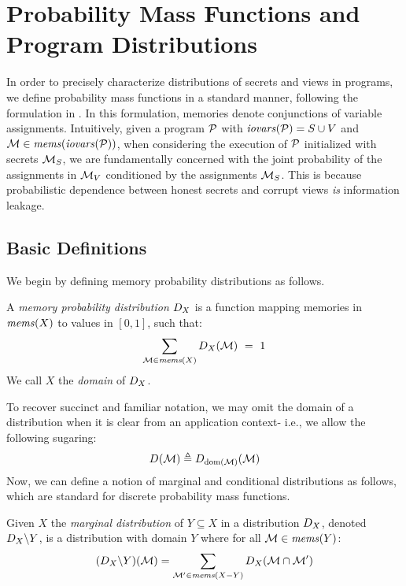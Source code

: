 \section{Probability Mass Functions and Program Distributions}
\label{section-pmf}

In order to precisely characterize distributions of secrets and views
in programs, we define probability mass functions in a standard manner,
following the formulation in \cite{barthe2019probabilistic}. In this formulation, memories
denote conjunctions of variable assignments. Intuitively, given a
program $\mathcal{P}$ with $\mathit{iovars}(\mathcal{P}) = S \cup V$ and $\mathcal{M} \in
\mathit{mems}(\mathit{iovars}(\mathcal{P}))$, when considering the execution of $\mathcal{P}$
initialized with secrets $\mathcal{M}_S$, we are fundamentally concerned
with the joint probability of the assignments in $\mathcal{M}_V$
conditioned by the assignments $\mathcal{M}_S$. This is because
probabilistic dependence between honest secrets and corrupt views
\emph{is} information leakage. 

\subsection{Basic Definitions} We begin by defining memory probability distributions as follows.
\begin{definition}
  A \emph{memory probability distribution} $D_{X}$ is a function
  mapping memories in $\mathit{mems}(X)$ to values in $[0,1]$, such that:
  $$
  \sum_{\mathcal{M} \in \mathit{mems}(X)} D_{X}(\mathcal{M}) \  = \ 1
  $$
  We call $X$ the \emph{domain} of $D_{X}$.
\end{definition}
To recover succinct and familiar notation, we may omit the domain of a
distribution when it is clear from an application context-
i.e., we allow the following sugaring:
$$
D_{}(\mathcal{M}) \triangleq D_{\mathrm{dom}(\mathcal{M})}(\mathcal{M})
$$
Now, we can define a notion of marginal and conditional
distributions as follows, which are standard for discrete
probability mass functions. 
\begin{definition}
  Given $X$ the \emph{marginal distribution} of $Y \subseteq X$
  in a distribution $D_{X}$, denoted $D_{X}\backslash Y$,
  is a distribution with domain $Y$ where for all
  $\mathcal{M} \in \mathit{mems}(Y)$:
  $$
  (D_{X}\backslash Y)(\mathcal{M}) =
  \sum_{\mathcal{M}' \in \mathit{mems}(X-Y)} D_{X}(\mathcal{M} \cap \mathcal{M}')
  $$
\end{definition}

